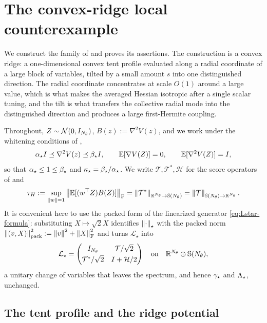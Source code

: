 \section{The convex-ridge local counterexample}
\label{app:ridge}

We construct the family of  and proves its assertions. The
construction is a convex ridge: a one-dimensional convex tent profile evaluated along a radial
coordinate of a large block of variables, tilted by a small amount $s$ into one distinguished
direction. The radial coordinate concentrates at scale $O(1)$ around a large value, which is
what makes the averaged Hessian isotropic after a single scalar tuning, and the tilt is what
transfers the collective radial mode into the distinguished direction and produces a large
first-Hermite coupling.

Throughout, $Z\sim\mathcal{N}(0,I_{N_\theta})$, $B(z):=\nabla^2V(z)$, and we work under the whitening
conditions of ,
\begin{equation}
\label{eq:ridge-whitening}
    \alpha_\star I\preceq\nabla^2V(z)\preceq\beta_\star I,
    \qquad
    \mathbb{E}[\nabla V(Z)]=0,
    \qquad
    \mathbb{E}[\nabla^2V(Z)]=I,
\end{equation}
so that $\alpha_\star\leq1\leq\beta_\star$ and $\kappa_\star=\beta_\star/\alpha_\star$. We write
$\mathcal T,\mathcal T^*,\mathcal H$ for the score operators of  and
\[
    \tau_H:=\sup_{\left\lVert w\right\rVert=1}\left\lVert \mathbb{E}[(w^\top Z)B(Z)]\right\rVert_{\mathrm{F}}
    =\left\lVert \mathcal T^*\right\rVert_{\mathbb{R}^{N_\theta}\to\mathbb{S}(N_\theta)}
    =\left\lVert \mathcal T\right\rVert_{\mathbb{S}(N_\theta)\to\mathbb{R}^{N_\theta}} .
\]
It is convenient here to use the packed form of the linearized generator
\eqref{eq:Lstar-formula}: substituting $X\mapsto\sqrt2X$ identifies $\left\lVert \cdot\right\rVert_\star$ with the
packed norm $\left\lVert (v,X)\right\rVert_{\mathrm{pack}}^2:=\left\lVert v\right\rVert^2+\left\lVert X\right\rVert_{\mathrm{F}}^2$ and turns
$\mathcal L_\star$ into
\begin{equation}
\label{eq:ridge-Lstar}
    \mathcal L_\star
    =\begin{pmatrix}
        I_{N_\theta} & \mathcal T/\sqrt2\\[1mm]
        \mathcal T^*/\sqrt2 & I+\mathcal H/2
    \end{pmatrix}
    \quad\text{on}\quad\mathbb{R}^{N_\theta}\oplus\mathbb{S}(N_\theta),
\end{equation}
a unitary change of variables that leaves the spectrum, and hence $\gamma_\star$ and $\Lambda_\star$,
unchanged.

\subsection{The tent profile and the ridge potential}

